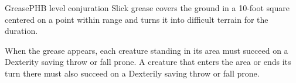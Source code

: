 \begin{spell}{Grease}{PHB}{ level conjuration}
{
}
Slick grease covers the ground in a 10-foot square
centered on a point within range and turns it into
difficult terrain for the duration.

When the grease appears, each creature standing in
its area must succeed on a Dexterity saving throw or fall
prone. A creature that enters the area or ends its turn
there must also succeed on a Dexterily saving throw
or fall prone.
\end{spell}